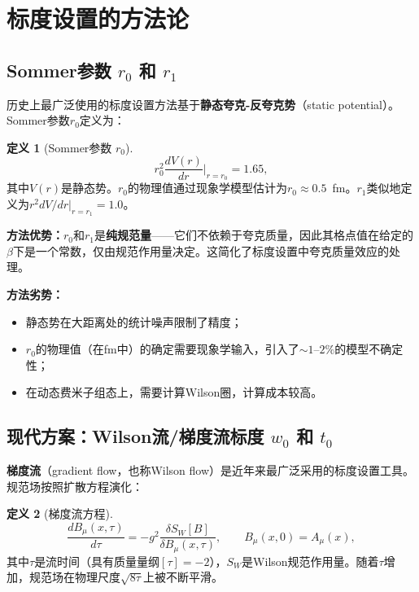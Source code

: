 \documentclass[12pt,a4paper]{ctexart}
\theoremstyle{definition}
\newtheorem{definition}{定义}[section]
\begin{document}
\section{标度设置的方法论}

\subsection{Sommer参数 $r_0$ 和 $r_1$}

历史上最广泛使用的标度设置方法基于\textbf{静态夸克-反夸克势}（static potential）\cite{CLQCD2024charm}。Sommer参数$r_0$定义为：

\begin{definition}[Sommer参数 $r_0$]
\begin{equation}
\boxed{r^2_0 \frac{dV(r)}{dr}\bigg|_{r=r_0} = 1.65},
\label{eq:Sommer_r0}
\end{equation}
其中$V(r)$是静态势。$r_0$的物理值通过现象学模型估计为$r_0 \approx 0.5$~fm。$r_1$类似地定义为$r^2 dV/dr|_{r=r_1} = 1.0$。
\end{definition}

\textbf{方法优势：}${r_0}$和$r_1$是\textbf{纯规范量}——它们不依赖于夸克质量，因此其格点值在给定的$\beta$下是一个常数，仅由规范作用量决定。这简化了标度设置中夸克质量效应的处理。

\textbf{方法劣势：}
\begin{itemize}
    \item 静态势在大距离处的统计噪声限制了精度；
    \item $r_0$的物理值（在fm中）的确定需要现象学输入，引入了$\sim 1$--$2\%$的模型不确定性；
    \item 在动态费米子组态上，需要计算Wilson圈，计算成本较高。
\end{itemize}

\subsection{现代方案：Wilson流/梯度流标度 $w_0$ 和 $t_0$}

\textbf{梯度流}（gradient flow，也称Wilson flow）\cite{NieMiera2025,Chen2025gluon,NoteGluonPDFs}是近年来最广泛采用的标度设置工具。规范场按照扩散方程演化：

\begin{definition}[梯度流方程]
\begin{equation}
\boxed{\frac{dB_\mu(x, \tau)}{d\tau} = -g^2 \frac{\delta S_W[B]}{\delta B_\mu(x, \tau)}}, \qquad B_\mu(x, 0) = A_\mu(x),
\label{eq:gradient_flow}
\end{equation}
其中$\tau$是流时间（具有质量量纲$[\tau] = -2$），$S_W$是Wilson规范作用量。随着$\tau$增加，规范场在物理尺度$\sqrt{8\tau}$上被不断平滑。
\end{definition}
\end{document}

